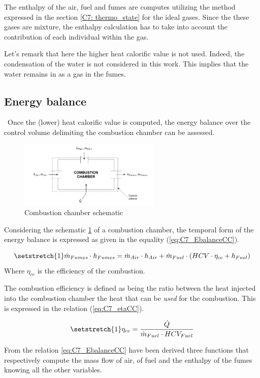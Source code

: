 The enthalpy of the air, fuel and fumes are computes utilizing the method expressed in the section \ref{C7: thermo_state} for the ideal gases. Since the these gases are mixture, the enthalpy calculation has to take into account the contribution of each individual within the gas.

Let's remark that here the higher heat calorific value is not used. Indeed, the condensation of the water is not considered in this work. This implies that the water remains in as a gas in the fumes.

\subsection{Energy balance}
\quad\ Once the (lower) heat calorific value is computed, the energy balance over the control volume delimiting the combustion chamber can be assessed.

\begin{figure}[h]
    \centering
    \includegraphics[width=0.6\textwidth]{Chapitre_7/Images/CC.png}
    \caption{Combustion chamber schematic}
    \label{fig:C7_CC}
\end{figure}

 Considering the schematic \ref{fig:C7_CC} of a combustion chamber, the temporal form of the energy balance is expressed as given in the equality (\ref{eq:C7_EbalanceCC}).
 
\begin{equation}
    \setstretch{1}
    \dot{m}_{Fumes}\cdot h_{Fumes} =  \dot{m}_{Air}\cdot h_{Air} + \dot{m}_{Fuel}\cdot\left(HCV\cdot \eta_{cc} + h_{Fuel}\right)\label{eq:C7_EbalanceCC}
\end{equation}
Where $\eta_{cc}$ is the efficiency of the combustion. 

The combustion efficiency is defined as being the ratio between the heat injected into the combustion chamber the heat that can be \textit{used} for the combustion. This is expressed in the relation (\ref{eq:C7_etaCC}).

\begin{equation}
    \setstretch{1}
    \eta_{cc} = \frac{\dot{Q}}{\dot{m}_{Fuel}\cdot HCV_{Fuel}}\label{eq:C7_etaCC}
\end{equation}

From the relation \ref{eq:C7_EbalanceCC} have been derived three functions that respectively compute the mass flow of air, of fuel and the enthalpy of the fumes knowing all the other variables.

